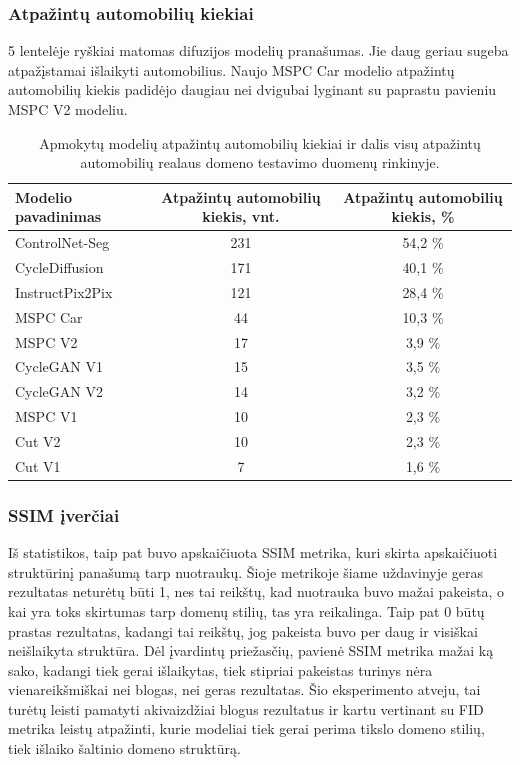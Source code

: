 \documentclass{VUMIFPSbakalaurinis}
\begin{document}
        \subsubsection{Atpažintų automobilių kiekiai}
            5 lentelėje ryškiai matomas difuzijos modelių pranašumas. Jie daug geriau sugeba atpažįstamai išlaikyti automobilius. Naujo MSPC Car modelio atpažintų automobilių kiekis padidėjo daugiau nei dvigubai lyginant su paprastu pavieniu MSPC V2 modeliu.
        
            \begin{table}[H]
                \footnotesize
                \centering
                \caption{Apmokytų modelių atpažintų automobilių kiekiai ir dalis visų atpažintų automobilių realaus domeno testavimo duomenų rinkinyje.}
                {\begin{tabular}{|l|c|c|} \hline
                    Modelio pavadinimas & Atpažintų automobilių kiekis, vnt. & Atpažintų automobilių kiekis, \% \\
                    \hline
                    ControlNet-Seg & 231 & 54,2 \%\\ %
                    CycleDiffusion & 171 & 40,1 \% \\ %
                    InstructPix2Pix & 121 & 28,4 \%\\ %
                    MSPC Car & 44 & 10,3 \%\\ %
                    MSPC V2 & 17 & 3,9 \%\\
                    CycleGAN V1 & 15 & 3,5 \%\\
                    CycleGAN V2 & 14 & 3,2 \%\\
                    MSPC V1 & 10 & 2,3 \%\\
                    Cut V2 & 10 & 2,3 \%\\ 
                    Cut V1 & 7 & 1,6 \%\\
                    \hline
                    \end{tabular}
                }
                \label{tab:car_stats_final}
            \end{table}

        \subsubsection{SSIM įverčiai}
            Iš statistikos, taip pat buvo apskaičiuota SSIM metrika, kuri skirta apskaičiuoti struktūrinį panašumą tarp nuotraukų. Šioje metrikoje šiame uždavinyje geras rezultatas neturėtų būti 1, nes tai reikštų, kad nuotrauka buvo mažai pakeista, o kai yra toks skirtumas tarp domenų stilių, tas yra reikalinga. Taip pat 0 būtų prastas rezultatas, kadangi tai reikštų, jog pakeista buvo per daug ir visiškai neišlaikyta struktūra. Dėl įvardintų priežasčių, pavienė SSIM metrika mažai ką sako, kadangi tiek gerai išlaikytas, tiek stipriai pakeistas turinys nėra vienareikšmiškai nei blogas, nei geras rezultatas. Šio eksperimento atveju, tai turėtų leisti pamatyti akivaizdžiai blogus rezultatus ir kartu vertinant su FID metrika leistų atpažinti, kurie modeliai tiek gerai perima tikslo domeno stilių, tiek išlaiko šaltinio domeno struktūrą. 
            
\end{document}
